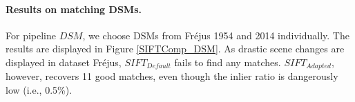 \paragraph{Results on matching \ac{DSM}s.}
For pipeline ${DSM}$, we choose \ac{DSM}s from Fr{\'e}jus 1954 and 2014 individually. The results are displayed in Figure \ref{SIFTComp_DSM}. As drastic scene changes are displayed in dataset Fr{\'e}jus, $SIFT_{Default}$ fails to find any matches. $SIFT_{Adapted}$, however, recovers 11 good matches, even though the inlier ratio is dangerously low (i.e., 0.5\%).\\
\begin{figure}[htbp]
	\begin{center}
\end{center}
\end{figure}

